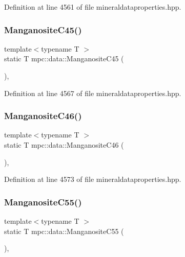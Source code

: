 Definition at line 4561 of file mineraldataproperties.\+hpp.

\mbox{\label{namespacempc_1_1data_ad5a113ff039a3422694174d12414bcfa}} 
\subsubsection{\texorpdfstring{Manganosite\+C45()}{ManganositeC45()}}
{\footnotesize\ttfamily template$<$typename T $>$ \\
static T mpc\+::data\+::\+Manganosite\+C45 (\begin{DoxyParamCaption}{ }\end{DoxyParamCaption})\hspace{0.3cm}{\ttfamily [inline]}, {\ttfamily [static]}}



Definition at line 4567 of file mineraldataproperties.\+hpp.

\mbox{\label{namespacempc_1_1data_a32311b19695d4687845495b29c284c07}} 
\subsubsection{\texorpdfstring{Manganosite\+C46()}{ManganositeC46()}}
{\footnotesize\ttfamily template$<$typename T $>$ \\
static T mpc\+::data\+::\+Manganosite\+C46 (\begin{DoxyParamCaption}{ }\end{DoxyParamCaption})\hspace{0.3cm}{\ttfamily [inline]}, {\ttfamily [static]}}



Definition at line 4573 of file mineraldataproperties.\+hpp.

\mbox{\label{namespacempc_1_1data_ae5bbb5938c2eccba409cf2aa4c742f47}} 
\subsubsection{\texorpdfstring{Manganosite\+C55()}{ManganositeC55()}}
{\footnotesize\ttfamily template$<$typename T $>$ \\
static T mpc\+::data\+::\+Manganosite\+C55 (\begin{DoxyParamCaption}{ }\end{DoxyParamCaption})\hspace{0.3cm}{\ttfamily [inline]}, {\ttfamily [static]}}



